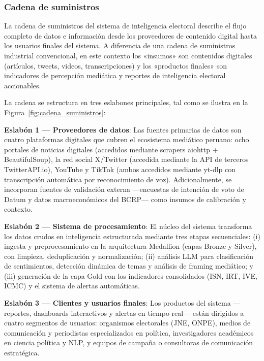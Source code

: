 \subsubsection{Cadena de suministros}

La cadena de suministros del sistema de inteligencia electoral describe el flujo completo de datos e información desde los proveedores de contenido digital hasta los usuarios finales del sistema. A diferencia de una cadena de suministros industrial convencional, en este contexto los «insumos» son contenidos digitales (artículos, tweets, videos, transcripciones) y los «productos finales» son indicadores de percepción mediática y reportes de inteligencia electoral accionables.

La cadena se estructura en tres eslabones principales, tal como se ilustra en la Figura~\ref{fig:cadena_suministros}:

\textbf{Eslabón 1 — Proveedores de datos}: Las fuentes primarias de datos son cuatro plataformas digitales que cubren el ecosistema mediático peruano: ocho portales de noticias digitales (accedidos mediante scrapers aiohttp + BeautifulSoup), la red social X/Twitter (accedida mediante la API de terceros TwitterAPI.io), YouTube y TikTok (ambos accedidos mediante yt-dlp con transcripción automática por reconocimiento de voz). Adicionalmente, se incorporan fuentes de validación externa —encuestas de intención de voto de Datum y datos macroeconómicos del BCRP— como insumos de calibración y contexto.

\textbf{Eslabón 2 — Sistema de procesamiento}: El núcleo del sistema transforma los datos crudos en inteligencia estructurada mediante tres etapas secuenciales: (i) ingesta y preprocesamiento en la arquitectura Medallion (capas Bronze y Silver), con limpieza, deduplicación y normalización; (ii) análisis LLM para clasificación de sentimientos, detección dinámica de temas y análisis de framing mediático; y (iii) generación de la capa Gold con los indicadores consolidados (ISN, IRT, IVE, ICMC) y el sistema de alertas automáticas.

\textbf{Eslabón 3 — Clientes y usuarios finales}: Los productos del sistema —reportes, dashboards interactivos y alertas en tiempo real— están dirigidos a cuatro segmentos de usuarios: organismos electorales (JNE, ONPE), medios de comunicación y periodistas especializados en política, investigadores académicos en ciencia política y NLP, y equipos de campaña o consultoras de comunicación estratégica.

